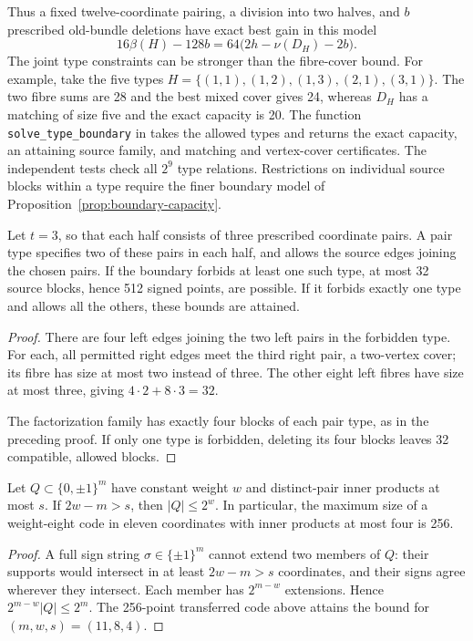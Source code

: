 Thus a fixed twelve-coordinate pairing, a division into two halves,
and $b$ prescribed old-bundle deletions have exact best gain in this model
\[
 16\beta(H)-128b=64\bigl(2h-\nu(D_H)-2b\bigr).
\]
The joint type constraints can be stronger than the fibre-cover bound.
For example, take the five types
$H=\{(1,1),(1,2),(1,3),(2,1),(3,1)\}$.
The two fibre sums are 28 and the best mixed cover gives 24, whereas
$D_H$ has a matching of size five and the exact capacity is 20.
The function \texttt{solve\_type\_boundary} in
 takes the allowed
types and returns the exact capacity, an attaining source family,
and matching and vertex-cover certificates. The independent tests
check all $2^9$ type relations.
Restrictions on individual source blocks within a type require the
finer boundary model of Proposition~\ref{prop:boundary-capacity}.

\begin{corollary}
\label{cor:forbidden-pair-type}
Let $t=3$, so that each half consists of three prescribed coordinate
pairs. A pair type specifies two of these pairs in each half, and
allows the source edges joining the chosen pairs. If the boundary
forbids at least one such type, at most 32 source blocks, hence 512
signed points, are possible. If it forbids exactly one type and allows
all the others, these bounds are attained.
\end{corollary}
\begin{proof}
There are four left edges joining the two left pairs in the forbidden
type. For each, all permitted right edges meet the third right pair,
a two-vertex cover; its fibre has size at most two instead of three.
The other eight left fibres have size at most three, giving
$4\cdot2+8\cdot3=32$.

The factorization family has exactly four blocks of each pair type,
as in the preceding proof. If only one type is forbidden, deleting
its four blocks leaves 32 compatible, allowed blocks.
\end{proof}

\begin{proposition}\label{prop:sign-capacity}
Let $Q\subset\{0,\pm1\}^m$ have constant weight $w$ and distinct-pair
inner products at most $s$. If $2w-m>s$, then $|Q|\le2^w$.
In particular, the maximum size of a weight-eight code in eleven
coordinates with inner products at most four is 256.
\end{proposition}
\begin{proof}
A full sign string $\sigma\in\{\pm1\}^m$ cannot extend two members
of $Q$: their supports would intersect in at least $2w-m>s$
coordinates, and their signs agree wherever they intersect.
Each member has $2^{m-w}$ extensions. Hence
$2^{m-w}|Q|\le2^m$. The 256-point transferred code above attains
the bound for $(m,w,s)=(11,8,4)$.
\end{proof}

